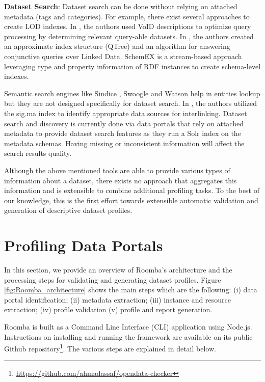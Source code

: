 \documentclass[runningheads,a4paper]{llncs}
\begin{document}
\textbf{Dataset Search}: Dataset search can be done without relying on attached metadata (tags and categories). For example, there exist several approaches to create LOD indexes. In \cite{Alexander:LDOW09}, the authors used VoID descriptions to optimize query processing by determining relevant query-able datasets. In \cite{Harth:2010:DSO:1772690.1772733}, the authors created an approximate index structure (QTree) and an algorithm for answering conjunctive queries over Linked Data. SchemEX \cite{Konrath:2012:SEC:2399444.2399563} is a stream-based approach leveraging type and property information of RDF instances to create schema-level indexes.

Semantic search engines like Sindice \cite{Delbru2010a}, Swoogle \cite{Ding2004} and Watson \cite{d'Aquin:2011:WMS:2019470.2019476} help in entities lookup but they are not designed specifically for dataset search. In \cite{whatShouldILinkTo}, the authors utilized the sig.ma index \cite{sig.ma} to identify appropriate data sources for interlinking. Dataset search and discovery is currently done via data portals that rely on attached metadata to provide dataset search features as they run a Solr index on the metadata schemas. Having missing or inconsistent information will affect the search results quality.

Although the above mentioned tools are able to provide various types of information about a dataset, there exists no approach that aggregates this information and is extensible to combine additional profiling tasks. To the best of our knowledge, this is the first effort towards extensible automatic validation and generation of descriptive dataset profiles.


\section{Profiling Data Portals}
\label{sec:framework}
In this section, we provide an overview of Roomba's architecture and the processing steps for validating and generating dataset profiles. Figure \ref{fig:Roomba_architecture} shows the main steps which are the following: (i) data portal identification; (ii) metadata extraction; (iii) instance and resource extraction; (iv) profile validation (v) profile and report generation.

Roomba is built as a Command Line Interface (CLI) application using Node.js. Instructions on installing and running the framework are available on its public Github repository\footnote{\url{https://github.com/ahmadassaf/opendata-checker}}. The various steps are explained in detail below.
\end{document}
